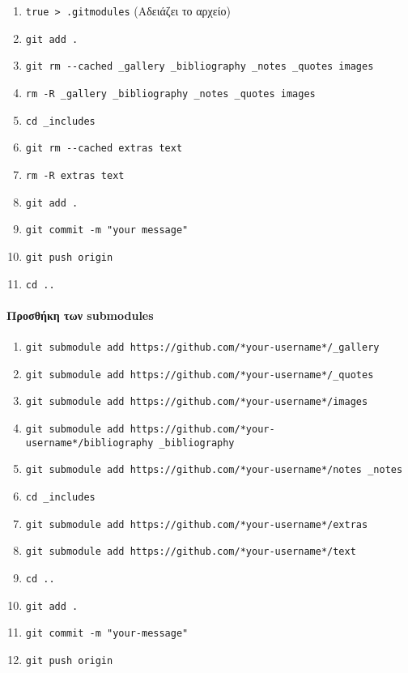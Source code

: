 \documentclass[
]{article}
\begin{document}
\begin{enumerate}
\item
  \texttt{true~\textgreater{}~.gitmodules} (Αδειάζει το αρχείο)
\item
  \texttt{git~add~.}
\item
  \texttt{git~rm~-\/-cached~\_gallery~\_bibliography~\_notes~\_quotes~images}
\item
  \texttt{rm~-R~\_gallery~\_bibliography~\_notes~\_quotes~images}
\item
  \texttt{cd~\_includes}
\item
  \texttt{git~rm~-\/-cached~extras~text}
\item
  \texttt{rm~-R~extras~text}
\item
  \texttt{git~add~.}
\item
  \texttt{git~commit~-m~"your~message"}
\item
  \texttt{git~push~origin}
\item
  \texttt{cd~..}
\end{enumerate}

\hypertarget{ux3c0ux3c1ux3bfux3c3ux3b8ux3aeux3baux3b7-ux3c4ux3c9ux3bd-submodules}{%
\paragraph{Προσθήκη των
submodules}\label{ux3c0ux3c1ux3bfux3c3ux3b8ux3aeux3baux3b7-ux3c4ux3c9ux3bd-submodules}}

\begin{enumerate}
\item
  \texttt{git~submodule~add~https://github.com/*your-username*/\_gallery}
\item
  \texttt{git~submodule~add~https://github.com/*your-username*/\_quotes}
\item
  \texttt{git~submodule~add~https://github.com/*your-username*/images}
\item
  \texttt{git~submodule~add~https://github.com/*your-username*/bibliography~\_bibliography}
\item
  \texttt{git~submodule~add~https://github.com/*your-username*/notes~\_notes}
\item
  \texttt{cd~\_includes}
\item
  \texttt{git~submodule~add~https://github.com/*your-username*/extras}
\item
  \texttt{git~submodule~add~https://github.com/*your-username*/text}
\item
  \texttt{cd~..}
\item
  \texttt{git~add~.}
\item
  \texttt{git~commit~-m~"your-message"}
\item
  \texttt{git~push~origin}
\end{enumerate}
\end{document}
